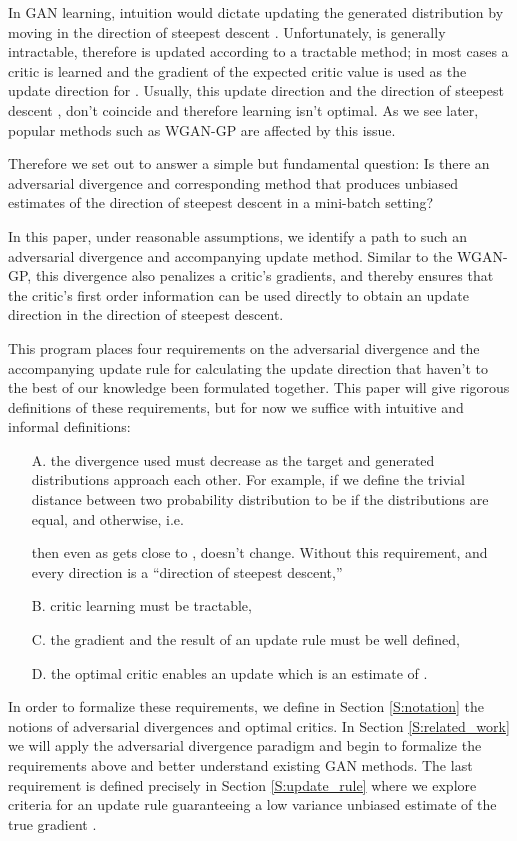 \documentclass{article}
\begin{document}
 In GAN learning, intuition would dictate updating the generated distribution by moving  in the direction of steepest descent
 . Unfortunately, 
 is generally intractable, therefore  is updated according to a tractable method; in most cases
 a critic  is learned and the gradient of the expected critic value
  is used as the update direction for .
 Usually, this update direction and the direction of steepest descent ,
 don't coincide and therefore learning isn't optimal.
 As we see later, popular methods such as WGAN-GP \cite{gulrajani2017improved} are affected by this issue.

 Therefore we set out to answer a simple but fundamental question:
 Is there an adversarial divergence and corresponding method that produces unbiased estimates of the direction of steepest descent in a mini-batch setting?

 In this paper, under reasonable assumptions, we identify a path
 to such an adversarial divergence and accompanying update method. Similar to the WGAN-GP,
 this divergence also penalizes a critic's gradients, and thereby ensures that
 the critic's first order information can be used directly to obtain an update direction
 in the direction of steepest descent.


 This program places four requirements
 on the adversarial divergence and the accompanying update rule for calculating the update direction
 that haven't to the best of our knowledge been formulated together.
 This paper will give rigorous definitions of these requirements, but for now we suffice with intuitive and informal definitions:
 \begin{enumerate}
  \item[A.] the divergence used must decrease as the target and generated distributions approach each other.
  For example, if we define the trivial distance between two probability distribution to be  if the distributions
  are equal, and  otherwise, i.e.\
  
  then even as  gets close to ,  doesn't change.
  Without this requirement,  and every direction is a ``direction of steepest descent,''
  \item[B.] critic learning must be tractable,
  \item[C.] the gradient  and the result of an update rule must be well defined,
  \item[D.] the optimal critic enables an update which is an estimate of .
 \end{enumerate}

 In order to formalize these requirements, we define in Section \ref{S:notation} the notions of adversarial divergences and
 optimal critics. In Section \ref{S:related_work} we will apply
 the adversarial divergence paradigm and begin to formalize the requirements above and better understand existing GAN methods.
 The last requirement is defined precisely in Section \ref{S:update_rule} where we explore criteria for an update rule guaranteeing a low
 variance unbiased estimate of the true gradient .
\end{document}

